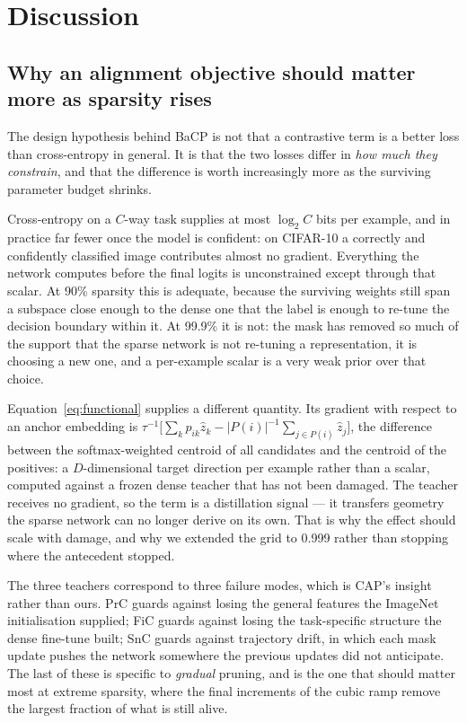 \section{Discussion}
\label{sec:discussion}

\subsection{Why an alignment objective should matter more as sparsity rises}

The design hypothesis behind BaCP is not that a contrastive term is a better loss
than cross-entropy in general. It is that the two losses differ in \emph{how much
they constrain}, and that the difference is worth increasingly more as the
surviving parameter budget shrinks.

Cross-entropy on a $C$-way task supplies at most $\log_2 C$ bits per example, and
in practice far fewer once the model is confident: on CIFAR-10 a correctly and
confidently classified image contributes almost no gradient. Everything the
network computes before the final logits is unconstrained except through that
scalar. At 90\% sparsity this is adequate, because the surviving weights still
span a subspace close enough to the dense one that the label is enough to
re-tune the decision boundary within it. At 99.9\% it is not: the mask has removed
so much of the support that the sparse network is not re-tuning a representation,
it is choosing a new one, and a per-example scalar is a very weak prior over that
choice.

Equation~\eqref{eq:functional} supplies a different quantity. Its gradient with
respect to an anchor embedding is
$\tau^{-1}\big[\sum_k p_{ik}\hat z_k - |P(i)|^{-1}\sum_{j\in P(i)} \hat z_j\big]$,
the difference between the softmax-weighted centroid of all candidates and the
centroid of the positives: a $D$-dimensional target direction per example rather
than a scalar, computed against a frozen dense teacher that has not been damaged.
The teacher receives no gradient, so the term is a distillation signal --- it
transfers geometry the sparse network can no longer derive on its own. That is why
the effect should scale with damage, and why we extended the grid to 0.999
rather than stopping where the antecedent stopped.

The three teachers correspond to three failure modes, which is CAP's insight
rather than ours. PrC guards against losing the general features the ImageNet
initialisation supplied; FiC guards against losing the task-specific structure the
dense fine-tune built; SnC guards against trajectory drift, in which each mask
update pushes the network somewhere the previous updates did not anticipate. The
last of these is specific to \emph{gradual} pruning, and is the one that should
matter most at extreme sparsity, where the final increments of the cubic ramp
remove the largest fraction of what is still alive.

